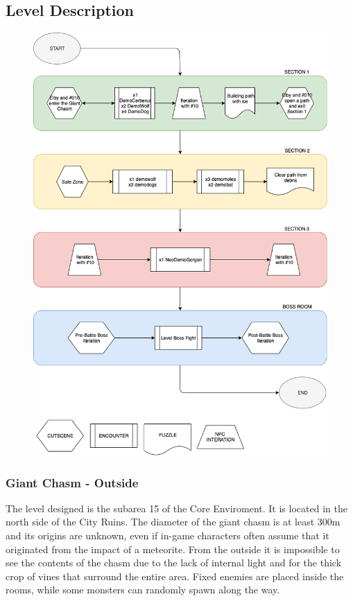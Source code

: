 \subsection{Level Description}
\begin{figure}[H]
	\centering
	\includegraphics[width=0.95\linewidth]{images/graphs/level_description.png}
\end{figure}
\newpage


\subsubsection{Giant Chasm - Outside}
The level designed is the subarea 15 of the Core Enviroment. It is located in the north side of the City Ruins. The diameter of the giant chasm is at least 300m and its origins are unknown, even if in-game characters often assume that it originated from the impact of a meteorite. From the outside it is impossible to see the contents of the chasm due to the lack of internal light and for the thick crop of vines that surround the entire area. Fixed enemies are placed inside the rooms, while some monsters can randomly spawn along the way.

